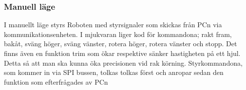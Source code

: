  

\subsubsection{Manuell läge}

I manuellt läge styrs Roboten med styrsignaler som skickas från PCn via 
kommunikationsenheten. I mjukvaran liger kod för kommandona; rakt 
fram, bakåt, sväng höger, sväng vänster, rotera höger, rotera vänster
och stopp. Det finns även en funktion trim som ökar respektive sänker 
hastigheten på ett hjul. Detta så att man ska kunna öka precisionen vid 
rak körning. Styrkommandona, som kommer in via SPI bussen, tolkas 
tolkas först och anropar sedan den funktion som efterfrågades av PCn



	

